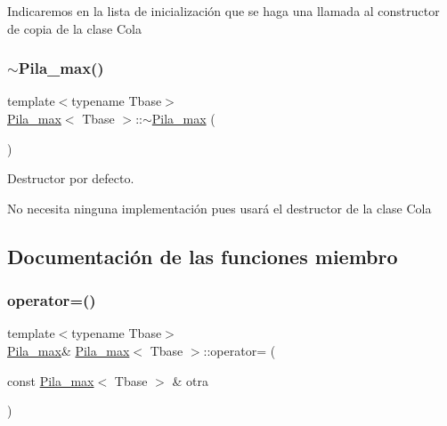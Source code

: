 Indicaremos en la lista de inicialización que se haga una llamada al constructor de copia de la clase Cola \mbox{\label{classPila__max_a84d64a0a0cece968a752cc5fb554b362}} 
\subsubsection{\texorpdfstring{$\sim$\+Pila\+\_\+max()}{~Pila\_max()}\hspace{0.1cm}{\footnotesize\ttfamily [2/2]}}
{\footnotesize\ttfamily template$<$typename Tbase$>$ \\
\hyperlink{classPila__max}{Pila\+\_\+max}$<$ Tbase $>$\+::$\sim$\hyperlink{classPila__max}{Pila\+\_\+max} (\begin{DoxyParamCaption}{ }\end{DoxyParamCaption})\hspace{0.3cm}{\ttfamily [default]}}



Destructor por defecto. 

No necesita ninguna implementación pues usará el destructor de la clase Cola 

\subsection{Documentación de las funciones miembro}
\mbox{\label{classPila__max_a9dd8b206b245be51149a2100a83529c7}} 
\subsubsection{\texorpdfstring{operator=()}{operator=()}\hspace{0.1cm}{\footnotesize\ttfamily [1/2]}}
{\footnotesize\ttfamily template$<$typename Tbase$>$ \\
\hyperlink{classPila__max}{Pila\+\_\+max}\& \hyperlink{classPila__max}{Pila\+\_\+max}$<$ Tbase $>$\+::operator= (\begin{DoxyParamCaption}\item[{const \hyperlink{classPila__max}{Pila\+\_\+max}$<$ Tbase $>$ \&}]{otra }\end{DoxyParamCaption})\hspace{0.3cm}{\ttfamily [default]}}



